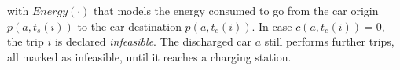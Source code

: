 with $Energy(\cdot)$ that models the energy consumed to go from the car origin $p(a,t_{s}(i))$ to the car destination $p(a,t_{e}(i))$.
In case $c(a,t_{e}(i)) = 0$, the trip $i$ is declared {\it infeasible}. 
The discharged car $a$ still performs further trips, all marked as infeasible, until it reaches a charging station.
%
%	
%	
%		
%	
%
